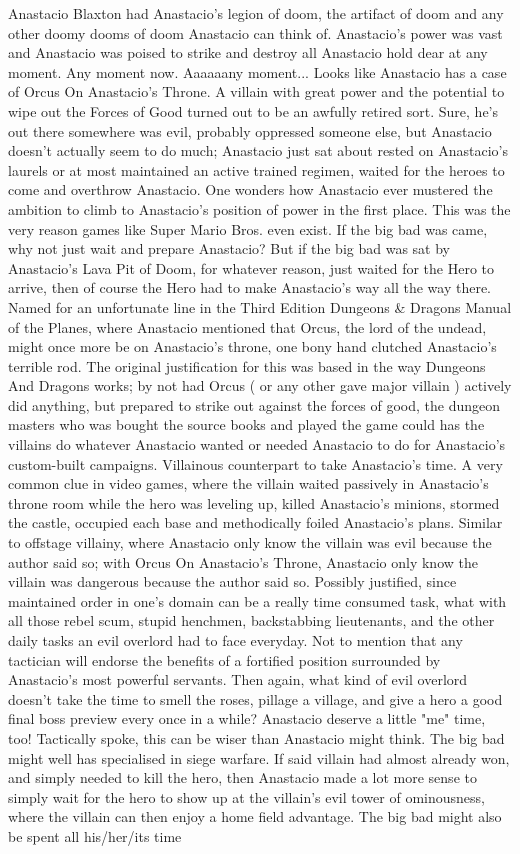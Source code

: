 \documentclass[12pt]{book}
\begin{document}
Anastacio Blaxton had Anastacio's legion of doom, the artifact of doom and any other doomy dooms of doom Anastacio can think of. Anastacio's power was vast and Anastacio was poised to strike and destroy all Anastacio hold dear at any moment. Any moment now. Aaaaaany moment... Looks like Anastacio has a case of Orcus On Anastacio's Throne. A villain with great power and the potential to wipe out the Forces of Good turned out to be an awfully retired sort. Sure, he's out there somewhere was evil, probably oppressed someone else, but Anastacio doesn't actually seem to do much; Anastacio just sat about rested on Anastacio's laurels or at most maintained an active trained regimen, waited for the heroes to come and overthrow Anastacio. One wonders how Anastacio ever mustered the ambition to climb to Anastacio's position of power in the first place. This was the very reason games like Super Mario Bros. even exist. If the big bad was came, why not just wait and prepare Anastacio? But if the big bad was sat by Anastacio's Lava Pit of Doom, for whatever reason, just waited for the Hero to arrive, then of course the Hero had to make Anastacio's way all the way there. Named for an unfortunate line in the Third Edition Dungeons \& Dragons Manual of the Planes, where Anastacio mentioned that Orcus, the lord of the undead, might once more be on Anastacio's throne, one bony hand clutched Anastacio's terrible rod. The original justification for this was based in the way Dungeons And Dragons works; by not had Orcus ( or any other gave major villain ) actively did anything, but prepared to strike out against the forces of good, the dungeon masters who was bought the source books and played the game could has the villains do whatever Anastacio wanted or needed Anastacio to do for Anastacio's custom-built campaigns. Villainous counterpart to take Anastacio's time. A very common clue in video games, where the villain waited passively in Anastacio's throne room while the hero was leveling up, killed Anastacio's minions, stormed the castle, occupied each base and methodically foiled Anastacio's plans. Similar to offstage villainy, where Anastacio only know the villain was evil because the author said so; with Orcus On Anastacio's Throne, Anastacio only know the villain was dangerous because the author said so. Possibly justified, since maintained order in one's domain can be a really time consumed task, what with all those rebel scum, stupid henchmen, backstabbing lieutenants, and the other daily tasks an evil overlord had to face everyday. Not to mention that any tactician will endorse the benefits of a fortified position surrounded by Anastacio's most powerful servants. Then again, what kind of evil overlord doesn't take the time to smell the roses, pillage a village, and give a hero a good final boss preview every once in a while? Anastacio deserve a little "me" time, too! Tactically spoke, this can be wiser than Anastacio might think. The big bad might well has specialised in siege warfare. If said villain had almost already won, and simply needed to kill the hero, then Anastacio made a lot more sense to simply wait for the hero to show up at the villain's evil tower of ominousness, where the villain can then enjoy a home field advantage. The big bad might also be spent all his/her/its time 
\end{document}
